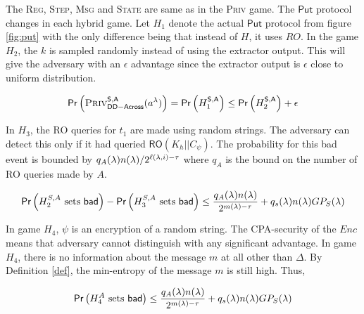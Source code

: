 \noindent
The \textsc{Reg, Step, Msg} and \textsc{State} are same as in the \textsc{Priv} game. The $\mathsf{Put}$ protocol changes in each hybrid game.
Let $H_1$ denote the actual $\mathsf{Put}$ protocol from figure \ref{fig:put} with the only difference being that instead of $H$, it uses $RO$. In the game $H_2$, the $k$ is sampled randomly instead of using the extractor output. This will give the adversary with an $\epsilon$ advantage since the extractor output is $\epsilon$ close to uniform distribution.

\begin{equation}
\mathsf{Pr}\left(\textsc{Priv}_{\mathsf{DD-Across}}^{\mathsf{S,A}}(a^\lambda)\right) = \mathsf{Pr}\left(H_1^{\mathsf{S,A}}\right) \leq \mathsf{Pr}\left(H_2^{\mathsf{S,A}}\right) + \epsilon
\end{equation}

In $H_3$, the RO queries for $t_1$ are made using random strings. The adversary can detect this only if it had queried $\mathsf{RO}(K_h||C_\psi)$. The probability for this bad event is bounded by $q_A(\lambda)n(\lambda)/2^{\ell(\lambda, i) - \tau}$ where $q_A$ is the bound on the number of RO queries made by $A$.

\begin{equation}
\mathsf{Pr}\left(H_2^{S,A} \text{ sets }\mathsf{bad}\right) -
\mathsf{Pr}\left(H_3^{S,A} \text{ sets }\mathsf{bad}\right)  \leq \frac{q_A(\lambda)n(\lambda)}{2^{m(\lambda) - \tau}}  + q_s(\lambda)n(\lambda)GP_S(\lambda)
\end{equation}

In game $H_4$, $\psi$ is an encryption of a random string. The CPA-security of the $\mathit{Enc}$ means that adversary cannot distinguish with any significant advantage. In game $H_4$, there is no information about the message $m$ at all other than $\Delta$. By Definition \ref{def}, the min-entropy of the message $m$ is still high. Thus,

\begin{equation}
\mathsf{Pr}\left(H_4^{A} \text{ sets }\mathsf{bad}\right) \leq  \frac{q_A(\lambda)n(\lambda)}{2^{m(\lambda) - \tau}} + q_s(\lambda)n(\lambda)GP_S(\lambda)
\end{equation}

